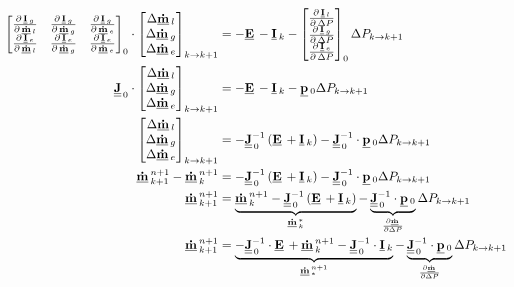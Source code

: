 \begin{align}
\begin{bmatrix}
\DerivParOne{\vec{I}_{g}}{\vec{\dot{m}}_{l}} & \DerivParOne{\vec{I}_{g}}{\vec{\dot{m}}_{g}}  & \DerivParOne{\vec{I}_{g}}{\vec{\dot{m}}_{e}} \\
\DerivParOne{\vec{I}_{e}}{\vec{\dot{m}}_{l}} & \DerivParOne{\vec{I}_{e}}{\vec{\dot{m}}_{g}}  & \DerivParOne{\vec{I}_{e}}{\vec{\dot{m}}_{e}}
\end{bmatrix}_{0}
\cdot
\begin{bmatrix}
\Delta \vec{\dot{m}}_l \\
\Delta \vec{\dot{m}}_g \\
\Delta \vec{\dot{m}}_e
\end{bmatrix}_{k\rightarrow k+1} & =
-\vec{E} -
\vec{I}_{k} -
\begin{bmatrix}
\DerivParOne{\vec{I}_{l}}{\Delta P} \\
\DerivParOne{\vec{I}_{g}}{\Delta P} \\
\DerivParOne{\vec{I}_{e}}{\Delta P}
\end{bmatrix}_{0}
\Delta P_{k \rightarrow k+1} \\
\mat{J}_{\,0}
\cdot
\begin{bmatrix}
\Delta \vec{\dot{m}}_l \\
\Delta \vec{\dot{m}}_g \\
\Delta \vec{\dot{m}}_e
\end{bmatrix}_{k\rightarrow k+1} & =
-\vec{E} -
\vec{I}_{k} -
\vec{p}_{0}
\Delta P_{k \rightarrow k+1} \\
\begin{bmatrix}
\Delta \vec{\dot{m}}_l \\
\Delta \vec{\dot{m}}_g \\
\Delta \vec{\dot{m}}_e
\end{bmatrix}_{k\rightarrow k+1} & =
-\mat{J}_{\,0}^{-1}\left(\vec{E} + \vec{I}_{k}\right) -
\mat{J}_{\,0}^{-1} \cdot \vec{p}_{0} \Delta P_{k \rightarrow k+1} \\
\vec{\dot{m}}^{n+1}_{k+1}- \vec{\dot{m}}^{n+1}_{k} & =
-\mat{J}_{\,0}^{-1}\left(\vec{E} + \vec{I}_{k}\right) -
\mat{J}_{\,0}^{-1} \cdot \vec{p}_{0} \Delta P_{k \rightarrow k+1}\\
\vec{\dot{m}}^{n+1}_{k+1} & =
\underbrace{\vec{\dot{m}}^{n+1}_{k} -\mat{J}_{\,0}^{-1}\left(\vec{E} + \vec{I}_{k}\right)}_{\vec{\dot{m}}^{*}_{k}} - \underbrace{\mat{J}_{\,0}^{-1} \cdot \vec{p}_{0}}_{\frac{\partial \vec{\dot{m}}}{\partial \Delta P}} \Delta P_{k \rightarrow k+1} \\
\vec{\dot{m}}^{n+1}_{k+1} & =
\underbrace{-\mat{J}_{\,0}^{-1}\cdot \vec{E} + \vec{\dot{m}}^{n+1}_{k} - \mat{J}^{-1}_{\,0}\cdot \vec{I}_{k}}_{\vec{\dot{m}}^{n+1}_{*}} - \underbrace{\mat{J}_{\,0}^{-1} \cdot \vec{p}_{0}}_{\frac{\partial \vec{\dot{m}}}{\partial \Delta P}} \Delta P_{k \rightarrow k+1}
\end{align}

